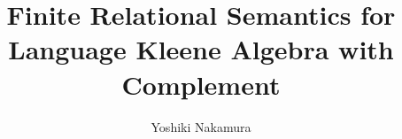 \documentclass[a4paper,USenglish, numberwithinsect, cleveref, autoref, thm-restate]{lipics-v2021}
\title{Finite Relational Semantics for Language Kleene Algebra with Complement} %
\author{Yoshiki Nakamura}{Institute of Science Tokyo, Japan}{nakamura.yoshiki.ny@gmail.com}{https://orcid.org/0000-0003-4106-0408}{}
\begin{document}
 

\maketitle

\begin{abstract}
    
\end{abstract}











\end{document}
